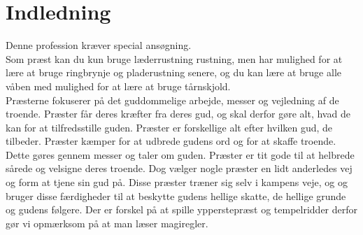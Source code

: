 
\chapter*{Indledning}
Denne profession kræver special ansøgning.\\
Som præst kan du kun bruge læderrustning rustning, men har mulighed for at lære at bruge ringbrynje og pladerustning senere, og du kan lære at bruge alle våben med mulighed for at lære at bruge tårnskjold.\\

Præsterne fokuserer på det guddommelige arbejde, messer og vejledning af de troende.
Præster får deres kræfter fra deres gud, og skal derfor gøre alt, hvad de kan for at tilfredsstille
guden. Præster er forskellige alt efter hvilken gud, de tilbeder. Præster kæmper for at
udbrede gudens ord og for at skaffe troende. Dette gøres gennem messer og taler om
guden. Præster er tit gode til at helbrede sårede og velsigne deres troende. Dog vælger nogle præster
en lidt anderledes vej og form at tjene sin gud på. Disse præster træner sig selv i kampens veje, og og
bruger disse færdigheder til at beskytte gudens hellige skatte, de hellige grunde og gudens følgere.
Der er forskel på at spille ypperstepræst og tempelridder derfor gør vi opmærksom på at man
læser magiregler.

